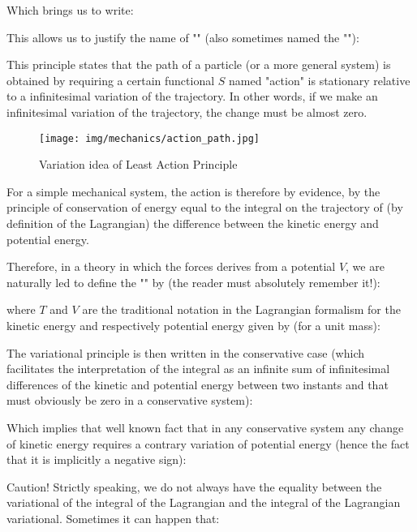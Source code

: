 	Which brings us to write:
	
	This allows us to justify the name of "" (also sometimes named the ""):
	
	This principle states that the path of a particle (or a more general system) is obtained by requiring a certain functional $S$ named "action" is stationary relative to a infinitesimal variation of the trajectory. In other words, if we make an infinitesimal variation of the trajectory, the change must be almost zero.
	
	\begin{figure}[H]
		\centering
		\texttt{[image: img/mechanics/action\_path.jpg]}
		\caption{Variation idea of Least Action Principle}
	\end{figure}
	
	For a simple mechanical system, the action is therefore by evidence, by the principle of conservation of energy equal to the integral on the trajectory of (by definition of the Lagrangian) the difference between the kinetic energy and potential energy.
	
	Therefore, in a theory in which the forces derives from a potential $V$, we are naturally led to define the "" by (the reader must absolutely remember it!):
	
	where $T$ and $V$ are the traditional notation in the Lagrangian formalism for the kinetic energy and respectively potential energy given by (for a unit mass):
	
	The variational principle is then written in the conservative case (which facilitates the interpretation of the integral as an infinite sum of infinitesimal differences of the kinetic and potential energy between two instants and that must obviously be zero in a conservative system):
	
	Which implies that well known fact that in any conservative system any change of kinetic energy requires a contrary variation of potential energy (hence the fact that it is implicitly a negative sign):
	
	Caution! Strictly speaking, we do not always have the equality between the variational of the integral of the Lagrangian and the integral of the Lagrangian variational. Sometimes it can happen that:
	
